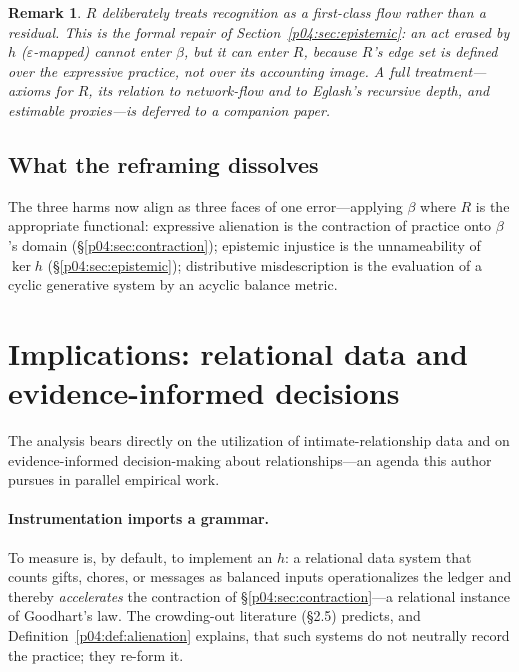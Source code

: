 \documentclass[11pt,a4paper]{article}
\newtheorem{remark}{Remark}
\begin{document}
\begin{remark}
$R$ deliberately treats \emph{recognition} as a first-class flow rather than
a residual. This is the formal repair of Section~\ref{p04:sec:epistemic}: an
act erased by $h$ ($\varepsilon$-mapped) cannot enter $\beta$, but it can
enter $R$, because $R$'s edge set is defined over the expressive practice,
not over its accounting image. A full treatment---axioms for $R$,
its relation to network-flow and to Eglash's recursive depth, and estimable
proxies---is deferred to a companion paper.
\end{remark}

\subsection{What the reframing dissolves}
The three harms now align as three faces of one error---applying $\beta$
where $R$ is the appropriate functional:
expressive alienation is the contraction of practice onto $\beta$'s domain
(\S\ref{p04:sec:contraction}); epistemic injustice is the unnameability of
$\ker h$ (\S\ref{p04:sec:epistemic}); distributive misdescription is the
evaluation of a cyclic generative system by an acyclic balance metric.

\section{Implications: relational data and evidence-informed decisions}
\label{p04:sec:data}

The analysis bears directly on the utilization of intimate-relationship data
and on evidence-informed decision-making about relationships---an agenda this
author pursues in parallel empirical work.

\paragraph{Instrumentation imports a grammar.}
To measure is, by default, to implement an $h$: a relational data system that
counts gifts, chores, or messages as balanced inputs operationalizes the
ledger and thereby \emph{accelerates} the contraction of
\S\ref{p04:sec:contraction}---a relational instance of Goodhart's law. The
crowding-out literature (\S2.5) predicts, and Definition~\ref{p04:def:alienation}
explains, that such systems do not neutrally record the practice; they
re-form it.
\end{document}
